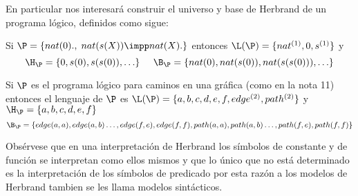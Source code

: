 \documentclass[11pt,letterpaper]{article}
\begin{document}

\smallskip

En particular nos interesar\'a construir el universo y base de Herbrand de un 
programa l\'ogico, definidos como sigue: 
\vspace*{-5pt}



\beje
Si $\P=\{nat(0).,\;nat(s(X))\impp nat(X).\}$ entonces
$\L(\P)=\{nat^{(1)},0,s^{(1)}\}$ y
\[
\H_\P=\{0,s(0),s(s(0)),\ldots\}\;\;\;\;\;\B_\P=\{nat(0),nat(s(0)),nat(s(s(0))),
\ldots\}
\]
\eeje


\beje
Si $\P$ es el programa l\'ogico para caminos en una gr\'afica (como en la nota 
11) entonces el lenguaje de $\P$ es $\L(\P)=\{a,b,c,d,e,f, edge^{(2)}, 
path^{(2)}\}$ y
$ \H_\P=\{a,b,c,d,e,f\} $
\[
\B_\P=\{edge(a,a),edge(a,b)\ldots, edge(f,e), edge(f,f),
path(a,a),path(a,b)\ldots,path(f,e),path(f,f)\}
\]
\eeje



Obs\'ervese que en una interpretaci\'on de Herbrand los s\'imbolos de constante 
y de funci\'on se interpretan como ellos mismos y que lo \'unico que no est\'a
determinado es la interpretaci\'on de los s\'imbolos de predicado por esta
raz\'on a los modelos de Herbrand tambien se les llama modelos sint\'acticos.
\end{document}
